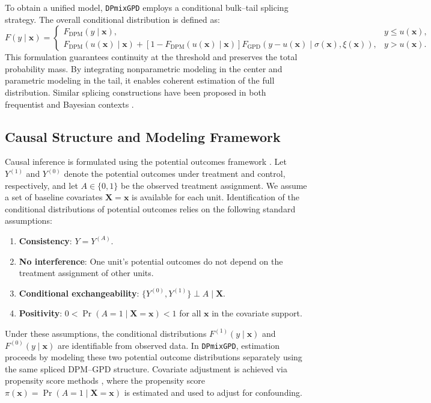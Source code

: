 \documentclass[article]{jss}\usepackage[]{graphicx}\usepackage[]{xcolor}
\begin{document}
To obtain a unified model, \texttt{DPmixGPD} employs a conditional bulk–tail splicing strategy. The overall conditional distribution is defined as:
\[
F(y \mid \mathbf{x}) =
\begin{cases}
F_{\text{DPM}}(y \mid \mathbf{x}), & y \le u(\mathbf{x}), \\
F_{\text{DPM}}(u(\mathbf{x}) \mid \mathbf{x}) +
[1 - F_{\text{DPM}}(u(\mathbf{x}) \mid \mathbf{x})]
F_{\text{GPD}}(y - u(\mathbf{x}) \mid \sigma(\mathbf{x}), \xi(\mathbf{x})), & y > u(\mathbf{x}).
\end{cases}
\]
This formulation guarantees continuity at the threshold and preserves the total probability mass. By integrating nonparametric modeling in the center and parametric modeling in the tail, it enables coherent estimation of the full distribution. Similar splicing constructions have been proposed in both frequentist and Bayesian contexts \citep{tancredi2006bayesian,carreau2009bayesian,naveau2016modeling}.

\subsection{Causal Structure and Modeling Framework}

Causal inference is formulated using the potential outcomes framework \citep{rubin1974estimating,imbens2015causal}. Let $Y^{(1)}$ and $Y^{(0)}$ denote the potential outcomes under treatment and control, respectively, and let $A \in \{0,1\}$ be the observed treatment assignment. We assume a set of baseline covariates $\mathbf{X} = \mathbf{x}$ is available for each unit. Identification of the conditional distributions of potential outcomes relies on the following standard assumptions:

\begin{enumerate}
  \item \textbf{Consistency}: $Y = Y^{(A)}$.
  \item \textbf{No interference}: One unit’s potential outcomes do not depend on the treatment assignment of other units.
  \item \textbf{Conditional exchangeability}: $\{Y^{(0)}, Y^{(1)}\} \perp A \mid \mathbf{X}$.
  \item \textbf{Positivity}: $0 < \Pr(A = 1 \mid \mathbf{X} = \mathbf{x}) < 1$ for all $\mathbf{x}$ in the covariate support.
\end{enumerate}

Under these assumptions, the conditional distributions $F^{(1)}(y \mid \mathbf{x})$ and $F^{(0)}(y \mid \mathbf{x})$ are identifiable from observed data. In \texttt{DPmixGPD}, estimation proceeds by modeling these two potential outcome distributions separately using the same spliced DPM--GPD structure. Covariate adjustment is achieved via propensity score methods \citep{rosenbaum1983central}, where the propensity score $\pi(\mathbf{x}) = \Pr(A = 1 \mid \mathbf{X} = \mathbf{x})$ is estimated and used to adjust for confounding.
\end{document}
